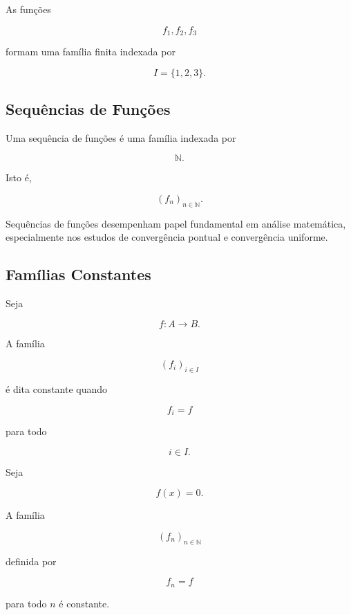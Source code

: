 \documentclass[../../main]{subfiles}
\begin{document}
\begin{ex}

	As funções

	\[
		f_1,f_2,f_3
	\]

	formam uma família finita indexada por

	\[
		I=\{1,2,3\}.
	\]

\end{ex}

\subsection{Sequências de Funções}

\begin{defn}
	\label{def:matematica:funcoes:familias:sequencia}

	Uma sequência de funções é uma família indexada por

	\[
		\mathbb N.
	\]

	Isto é,

	\[
		(f_n)_{n\in\mathbb N}.
	\]

\end{defn}

\begin{obs}

	Sequências de funções desempenham papel fundamental em análise
	matemática, especialmente nos estudos de convergência pontual e
	convergência uniforme.

\end{obs}

\subsection{Famílias Constantes}

\begin{defn}
	\label{def:matematica:funcoes:familias:constante}

	Seja

	\[
		f:A\to B.
	\]

	A família

	\[
		(f_i)_{i\in I}
	\]

	é dita constante quando

	\[
		f_i=f
	\]

	para todo

	\[
		i\in I.
	\]

\end{defn}

\begin{ex}

	Seja

	\[
		f(x)=0.
	\]

	A família

	\[
		(f_n)_{n\in\mathbb N}
	\]

	definida por

	\[
		f_n=f
	\]

	para todo \(n\) é constante.

\end{ex}
\end{document}
